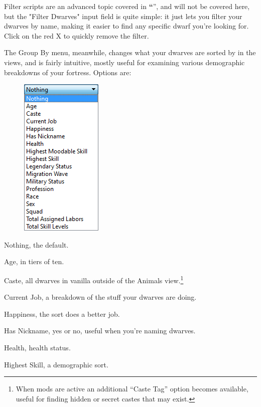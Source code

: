 \documentclass[]{article}
\newcommand{\jump}[1] {\textbf{``\nameref{sec:#1}}''}
\begin{document}
Filter scripts are an advanced topic covered in \jump{Filter Scripts}, and will not
be covered here, but the "Filter Dwarves" input field is quite simple: it just lets you filter your
dwarves by name, making it easier to find any specific dwarf  you're looking for. Click on the red X to
quickly remove the filter.

The Group By menu, meanwhile, changes what your dwarves are sorted by in the views, and is fairly
intuitive, mostly useful for examining various demographic breakdowns of your fortress. Options are:
\vspace{12pt}

\begin{figure}
\begin{center}
\vspace{-10pt}
\includegraphics[scale=.85]{Sec1Fig11+.png}
\vspace{-20pt}
\end{center}
\end{figure}
\noindent Nothing, the default.

\noindent Age, in tiers of ten.

\noindent Caste, all dwarves in vanilla outside of the Animals view.\footnote{When mods are active an
additional ``Caste Tag'' option becomes available, useful for finding hidden or secret castes that may
exist.}

\noindent Current Job, a breakdown of the stuff your dwarves are doing.

\noindent Happiness, the sort does a better job.

\noindent Has Nickname, yes or no, useful when you're naming dwarves.

\noindent Health, health status.

\noindent Highest Skill, a demographic sort.
\end{document}
